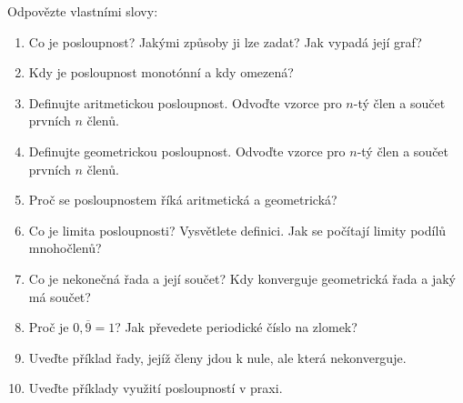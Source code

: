 \begin{problem}
  Odpovězte vlastními slovy:
  \begin{enumerate}
    \item Co je posloupnost? Jakými způsoby ji lze zadat? Jak vypadá její graf?
    \item Kdy je posloupnost monotónní a kdy omezená?
    \item Definujte aritmetickou posloupnost. Odvoďte vzorce pro $n$-tý člen a součet prvních $n$ členů.
    \item Definujte geometrickou posloupnost. Odvoďte vzorce pro $n$-tý člen a součet prvních $n$ členů.
    \item Proč se posloupnostem říká aritmetická a geometrická?
    \item Co je limita posloupnosti? Vysvětlete definici. Jak se počítají limity podílů mnohočlenů?
    \item Co je nekonečná řada a její součet? Kdy konverguje geometrická řada a jaký má součet?
    \item Proč je $0{,}\overline{9} = 1$? Jak převedete periodické číslo na zlomek?
    \item Uveďte příklad řady, jejíž členy jdou k nule, ale která nekonverguje.
    \item Uveďte příklady využití posloupností v praxi.
  \end{enumerate}
\end{problem}
